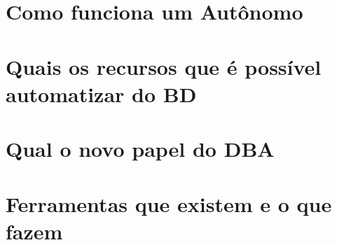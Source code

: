 \section{Como funciona um Autônomo}

\lipsum[1-2]


\section{Quais os recursos que é possível automatizar do BD}

\lipsum[1-2]





\section{Qual o novo papel do DBA}

\lipsum[1-2]


\section{Ferramentas que existem e o que fazem}

\lipsum[1-20]

